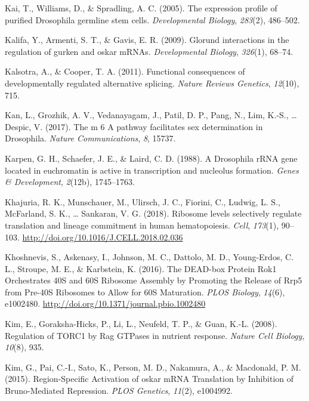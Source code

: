 \documentclass[12pt,twoside]{reedthesis}
\newlength{\cslhangindent}
\newenvironment{cslreferences}%
  {\setlength{\parindent}{0pt}%
  \everypar{\setlength{\hangindent}{\cslhangindent}}\ignorespaces}%
  {\par}
\begin{document}
\begin{cslreferences}
\leavevmode\hypertarget{ref-Kai2005}{}%
Kai, T., Williams, D., \& Spradling, A. C. (2005). The expression profile of purified Drosophila germline stem cells. \emph{Developmental Biology}, \emph{283}(2), 486--502.

\leavevmode\hypertarget{ref-Kalifa2009}{}%
Kalifa, Y., Armenti, S. T., \& Gavis, E. R. (2009). Glorund interactions in the regulation of gurken and oskar mRNAs. \emph{Developmental Biology}, \emph{326}(1), 68--74.

\leavevmode\hypertarget{ref-Kalsotra2011}{}%
Kalsotra, A., \& Cooper, T. A. (2011). Functional consequences of developmentally regulated alternative splicing. \emph{Nature Reviews Genetics}, \emph{12}(10), 715.

\leavevmode\hypertarget{ref-Kan2017}{}%
Kan, L., Grozhik, A. V., Vedanayagam, J., Patil, D. P., Pang, N., Lim, K.-S., \ldots{} Despic, V. (2017). The m 6 A pathway facilitates sex determination in Drosophila. \emph{Nature Communications}, \emph{8}, 15737.

\leavevmode\hypertarget{ref-Karpen1988a}{}%
Karpen, G. H., Schaefer, J. E., \& Laird, C. D. (1988). A Drosophila rRNA gene located in euchromatin is active in transcription and nucleolus formation. \emph{Genes \& Development}, \emph{2}(12b), 1745--1763.

\leavevmode\hypertarget{ref-Khajuria2018a}{}%
Khajuria, R. K., Munschauer, M., Ulirsch, J. C., Fiorini, C., Ludwig, L. S., McFarland, S. K., \ldots{} Sankaran, V. G. (2018). Ribosome levels selectively regulate translation and lineage commitment in human hematopoiesis. \emph{Cell}, \emph{173}(1), 90--103. \url{http://doi.org/10.1016/J.CELL.2018.02.036}

\leavevmode\hypertarget{ref-khoshnevisDEADboxProteinRok12016}{}%
Khoshnevis, S., Askenasy, I., Johnson, M. C., Dattolo, M. D., Young-Erdos, C. L., Stroupe, M. E., \& Karbstein, K. (2016). The DEAD-box Protein Rok1 Orchestrates 40S and 60S Ribosome Assembly by Promoting the Release of Rrp5 from Pre-40S Ribosomes to Allow for 60S Maturation. \emph{PLOS Biology}, \emph{14}(6), e1002480. \url{http://doi.org/10.1371/journal.pbio.1002480}

\leavevmode\hypertarget{ref-Kim2008b}{}%
Kim, E., Goraksha-Hicks, P., Li, L., Neufeld, T. P., \& Guan, K.-L. (2008). Regulation of TORC1 by Rag GTPases in nutrient response. \emph{Nature Cell Biology}, \emph{10}(8), 935.

\leavevmode\hypertarget{ref-Kim2015m}{}%
Kim, G., Pai, C.-I., Sato, K., Person, M. D., Nakamura, A., \& Macdonald, P. M. (2015). Region-Specific Activation of oskar mRNA Translation by Inhibition of Bruno-Mediated Repression. \emph{PLOS Genetics}, \emph{11}(2), e1004992.


\end{cslreferences}
\end{document}
